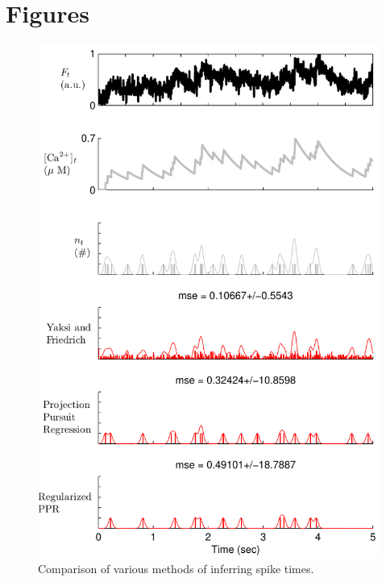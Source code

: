 \documentclass[12pt]{article}
\begin{document}


\clearpage
\section{Figures}

\begin{figure}
\includegraphics[width=1.0\linewidth]{comp1}
\caption{Comparison of various methods of inferring spike times. %
} \label{fig:comp}
\end{figure}
\end{document}
